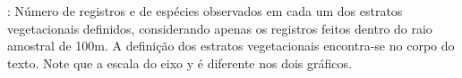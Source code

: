 \label{fig:aves4}: Número de registros e de espécies observados em cada um dos estratos vegetacionais definidos, considerando apenas os registros feitos dentro do raio amostral de 100m. 
A definição dos estratos vegetacionais encontra-se no corpo do texto. Note que a escala do eixo y é diferente nos dois gráficos.